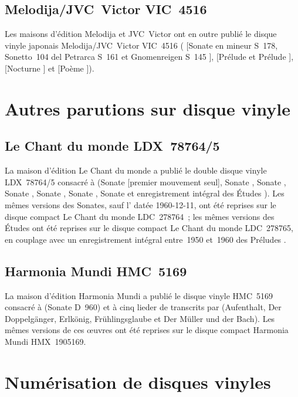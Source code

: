 \subsection{Melodija/JVC~Victor VIC~4516}

Les maisons d'édition Melodija et JVC~Victor ont en outre publié le disque
vinyle japonais Melodija/JVC~Victor VIC~4516 (\Liszt{} [Sonate en \kB mineur
S~178, Sonetto~104 del Petrarca S~161  et Gnomenreigen S~145
], \Rachmaninov{} [Prélude   et Prélude
 ], \Chopin{} [Nocturne  ] et
\Scriabine{} [Poème  ]).

\section{Autres parutions sur disque vinyle}

\subsection{Le Chant du monde LDX~78764/5}

La maison d'édition Le Chant du monde a publié le double disque vinyle
LDX~78764/5 consacré à \Scriabine{} (Sonate  [premier mouvement
seul], Sonate , Sonate , Sonate , Sonate
, Sonate , Sonate  et enregistrement intégral des
Études ).
Les mêmes versions des Sonates, sauf l' datée 1960-12-11, ont été
reprises sur le disque compact Le Chant du monde LDC~278764~; les mêmes
versions des Études ont été reprises sur le disque compact Le Chant du monde
LDC~278765, en couplage avec un enregistrement intégral entre~1950 et~1960
des Préludes .

\subsection{Harmonia Mundi HMC~5169}

La maison d'édition Harmonia Mundi a publié le disque vinyle HMC~5169
consacré à \Schubert{} (Sonate D~960) et à cinq lieder de \Schubert{}
transcrits par \Liszt{} (Aufenthalt, Der Doppelgänger, Erlkönig,
Frühlingsglaube et Der Müller und der Bach).
Les mêmes versions de ces œuvres ont été reprises sur le disque compact
Harmonia Mundi HMX~1905169.

\section{Numérisation de disques vinyles}

